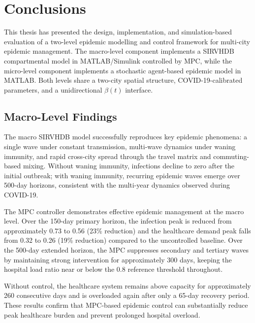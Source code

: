 

\chapter{Conclusions}
\label{ch:conclusion}

This thesis has presented the design, implementation, and simulation-based evaluation of a two-level epidemic modelling and control framework for multi-city epidemic management.
The macro-level component implements a SIRVHDB compartmental model in MATLAB/Simulink controlled by MPC, while the micro-level component implements a stochastic agent-based epidemic model in MATLAB.
Both levels share a two-city spatial structure, COVID-19-calibrated parameters, and a unidirectional $\beta(t)$ interface.

\section{Macro-Level Findings}
\label{sec:conclusions_macro}

The macro SIRVHDB model successfully reproduces key epidemic phenomena: a single wave under constant transmission, multi-wave dynamics under waning immunity, and rapid cross-city spread through the travel matrix and commuting-based mixing.
Without waning immunity, infections decline to zero after the initial outbreak; with waning immunity, recurring epidemic waves emerge over 500-day horizons, consistent with the multi-year dynamics observed during COVID-19.

The MPC controller demonstrates effective epidemic management at the macro level.
Over the 150-day primary horizon, the infection peak is reduced from approximately 0.73 to 0.56 (23\% reduction) and the healthcare demand peak falls from 0.32 to 0.26 (19\% reduction) compared to the uncontrolled baseline.
Over the 500-day extended horizon, the MPC suppresses secondary and tertiary waves by maintaining strong intervention for approximately 300 days, keeping the hospital load ratio near or below the 0.8 reference threshold throughout.

Without control, the healthcare system remains above capacity for approximately 260 consecutive days and is overloaded again after only a 65-day recovery period.
These results confirm that MPC-based epidemic control can substantially reduce peak healthcare burden and prevent prolonged hospital overload.

